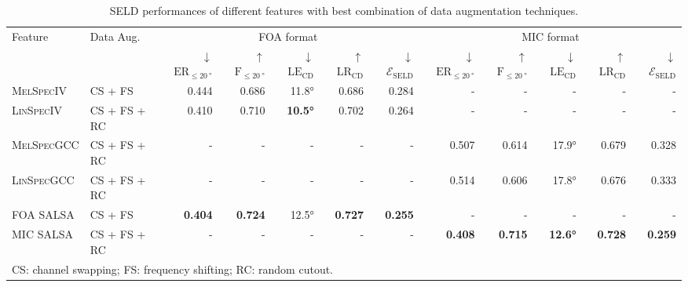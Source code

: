 \documentclass[journal]{IEEEtran}
\begin{document}
\begin{table*}[t]
    \centering
    \caption{SELD performances of different features with best combination of data augmentation techniques.}
    \noindent\begin{tabularx}{\textwidth}{Xl rrrrr rrrrr }
    \toprule 
        \multirow{2}[2]{*}{Feature} & 
        \multirow{2}[2]{*}{Data Aug.} &  
        \multicolumn{5}{c}{FOA format} &
        \multicolumn{5}{c}{MIC format}
    \\ \cmidrule(lr){3-7}\cmidrule(lr){8-12}
        & & 
        $\downarrow$ $\text{ER}_{\le \SI{20}{\degree}}$ &
        $\uparrow$ $\text{F}_{\le \SI{20}{\degree}}$ &
        $\downarrow$ $\text{LE}_\text{CD}$&
        $\uparrow$ $\text{LR}_\text{CD}$ &
        $\downarrow$ $\mathcal{E}_\text{SELD}$ &
        $\downarrow$ $\text{ER}_{\le \SI{20}{\degree}}$ &
        $\uparrow$ $\text{F}_{\le \SI{20}{\degree}}$ &
        $\downarrow$ $\text{LE}_\text{CD}$&
        $\uparrow$ $\text{LR}_\text{CD}$ &
        $\downarrow$ $\mathcal{E}_\text{SELD}$
        \\ \midrule
        \textsc{MelSpecIV}   & CS + FS 
                    & 0.444 & 0.686 & 11.8\si{\degree} & 0.686 & 0.284 
                    & - & - & - & - & - \\
        \textsc{LinSpecIV}   & CS + FS + RC
                    & 0.410 & 0.710 & \bf{10.5\si{\degree}} & 0.702 & 0.264
                    & - & - & - & - & - \\
        \textsc{MelSpecGCC}  & CS + FS + RC
                    & - & - & - & - & - 
                    & 0.507 & 0.614 & 17.9\si{\degree} & 0.679 & 0.328 \\ 
        \textsc{LinSpecGCC}  & CS + FS + RC
                    & - & - & - & - & - 
                    & 0.514 & 0.606 & 17.8\si{\degree} & 0.676 & 0.333 \\
        \midrule                    
        FOA SALSA   & CS + FS
                    & \bf{0.404} & \bf{0.724} & 12.5\si{\degree} & \bf{0.727} & \bf{0.255} 
                    & - & - & - & - & - \\
        MIC SALSA   & CS + FS + RC
                    & - & - & - & - & - 
                    & \bf{0.408} & \bf{0.715} & \bf{12.6\si{\degree}} & \bf{0.728} & \bf{0.259} \\
    \bottomrule
    \multicolumn{8}{l}{CS: channel swapping; FS: frequency shifting; RC: random cutout.}
    \end{tabularx}
    \label{tab:bestaug}
\end{table*}
\end{document}
